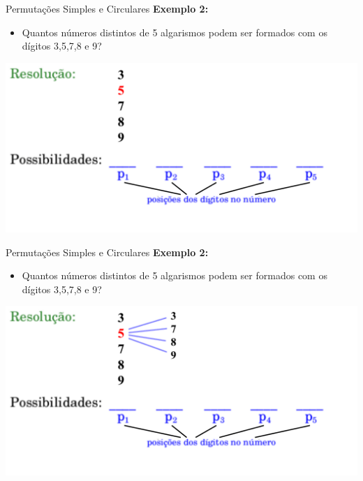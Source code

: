 \documentclass[aspectratio=169]{beamer}
\begin{document}
\begin{frame}{Permutações Simples e Circulares}
    \textbf{Exemplo 2:}

    \vspace{3mm}

    \begin{itemize}
        \item[] Quantos números distintos de 5 algarismos podem ser formados com os dígitos 3,5,7,8 e 9?
    \end{itemize}

    \begin{center}
        \includegraphics[width=0.75\linewidth]{figs/Exemplo2_2.png}
    \end{center}
\end{frame}

\begin{frame}{Permutações Simples e Circulares}
    \textbf{Exemplo 2:}

    \vspace{3mm}

    \begin{itemize}
        \item[] Quantos números distintos de 5 algarismos podem ser formados com os dígitos 3,5,7,8 e 9?
    \end{itemize}

    \begin{center}
        \includegraphics[width=0.75\linewidth]{figs/Exemplo2_3.png}
    \end{center}
\end{frame}
\end{document}

